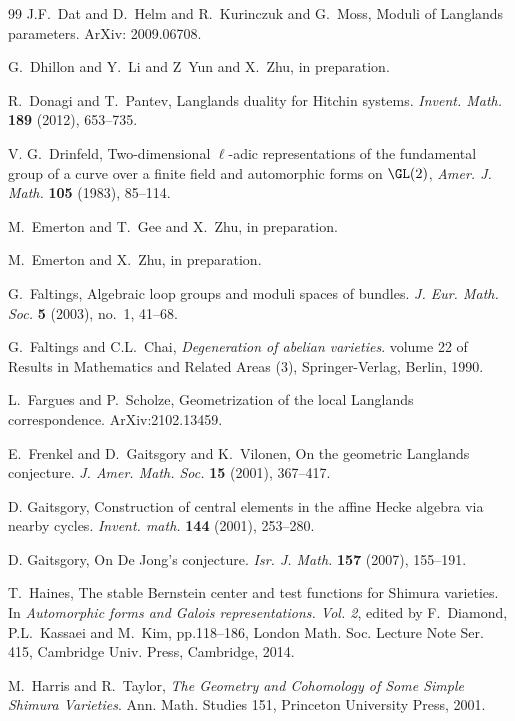 \documentclass[11pt]{amsart}
\theoremstyle{definition}
\theoremstyle{definition}
\theoremstyle{definition}
\numberwithin{equation}{section}
\begin{document}
\begin{thebibliography}{99}
J.F.~Dat and D.~Helm and R.~Kurinczuk and G.~Moss, Moduli of Langlands parameters. ArXiv: 2009.06708.

G.~Dhillon and Y.~Li and Z~Yun and X.~Zhu, in preparation. 

R.~Donagi and T.~Pantev, Langlands duality for Hitchin systems. \emph{Invent. Math.} \textbf{189} (2012), 653--735.

V. G.~Drinfeld, Two-dimensional $\ell$-adic representations of the fundamental group of a curve over a finite field and automorphic forms on $\GL(2)$, \emph{Amer. J. Math.} \textbf{105} (1983), 85--114.

M.~Emerton and T.~Gee and X.~Zhu, in preparation.

M.~Emerton and X.~Zhu, in preparation.

G.~Faltings, Algebraic loop groups and moduli spaces of bundles. \emph{J. Eur. Math. Soc.} \textbf{5} (2003), no.~1, 41--68.

G.~Faltings and C.L.~Chai, \emph{Degeneration of abelian varieties}. volume 22 of Results in Mathematics and Related Areas (3), Springer-Verlag, Berlin, 1990.

L.~Fargues and P.~Scholze, Geometrization of the local Langlands correspondence. ArXiv:2102.13459.

E.~Frenkel and D.~Gaitsgory and K.~Vilonen, On the geometric Langlands conjecture. \emph{J. Amer. Math. Soc.} \textbf{15} (2001), 367--417.

D. Gaitsgory, Construction of central elements in the affine Hecke algebra via nearby cycles. \emph{Invent. math.} \textbf{144} (2001), 253--280.

D. Gaitsgory, On De Jong's conjecture. \emph{Isr. J. Math.} \textbf{157} (2007), 155--191. 

T.~Haines, The stable Bernstein center and test functions for Shimura varieties. In \emph{Automorphic forms and Galois representations. Vol. 2}, edited by
F.~Diamond, P.L.~Kassaei and M.~Kim, pp.118--186, London Math. Soc. Lecture Note Ser. 415, Cambridge Univ. Press, Cambridge, 2014.

M.~Harris and R.~Taylor, \emph{The Geometry and Cohomology of Some Simple Shimura Varieties}.  Ann. Math. Studies 151, Princeton University Press, 2001.


\end{thebibliography}
\end{document}
